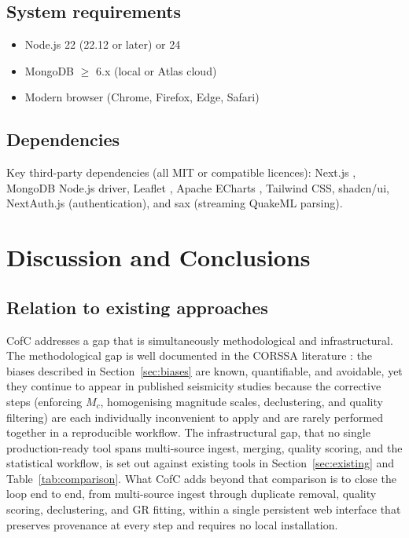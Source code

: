 \documentclass[12pt]{article}
\begin{document}
\subsection*{System requirements}

\begin{itemize}[leftmargin=*]
  \item Node.js 22 (22.12 or later) or 24
  \item MongoDB $\geq$ 6.x (local or Atlas cloud)
  \item Modern browser (Chrome, Firefox, Edge, Safari)
\end{itemize}

\subsection*{Dependencies}

Key third-party dependencies (all MIT or compatible licences): Next.js
\citep{nextjs2024}, MongoDB Node.js driver, Leaflet \citep{leaflet2024},
Apache ECharts \citep{echarts2024}, Tailwind CSS, shadcn/ui, NextAuth.js
(authentication), and sax (streaming QuakeML parsing).

\section{Discussion and Conclusions}
\label{sec:discussion}

\subsection{Relation to existing approaches}

CofC addresses a gap that is simultaneously methodological and
infrastructural.  The methodological gap is well documented in the CORSSA
literature \citep{naylor2010, mignan2012, vanstiphout2012}: the biases
described in Section~\ref{sec:biases} are known, quantifiable, and avoidable,
yet they continue to appear in published seismicity studies because the
corrective steps (enforcing $M_c$, homogenising magnitude scales, declustering,
and quality filtering) are each individually inconvenient to apply and are
rarely performed together in a reproducible workflow.  The infrastructural gap,
that no single production-ready tool spans multi-source ingest, merging, quality
scoring, and the statistical workflow, is set out against existing tools in
Section~\ref{sec:existing} and Table~\ref{tab:comparison}.  What CofC adds beyond
that comparison is to close the loop end to end, from multi-source ingest through
duplicate removal, quality scoring, declustering, and GR fitting, within a single
persistent web interface that preserves provenance at every step and requires no
local installation.
\end{document}
